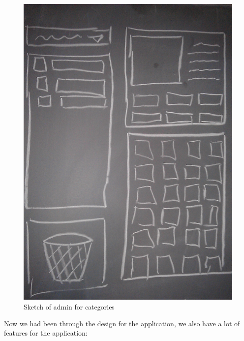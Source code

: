 \begin{figure}[htbp]
	\centering
		\includegraphics[scale=0.10]{input/images/admincate.jpg}
	\caption{Sketch of admin for categories}
	\label{fig:admincate}
\end{figure}

Now we had been through the design for the application, we also have a lot of features for the application: 

